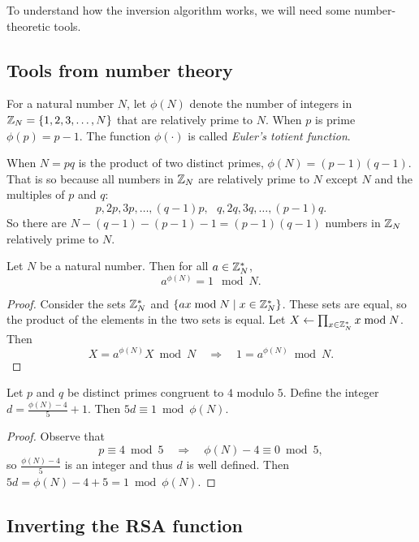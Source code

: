 To understand how the inversion algorithm works, we will need some
number-theoretic tools.


\subsection{Tools from number theory}
For a natural number $N$, let $\phi(N)$ denote the number of integers
in $\mathbb{Z}_N = \{1, 2, 3, \dots, N\}$ that are relatively prime to $N$.
When $p$ is prime $\phi(p) = p-1$.
The function $\phi(\cdot)$ is called \emph{Euler's totient function}.

When $N=pq$ is the product of two distinct primes, $\phi(N) = (p-1)(q-1)$.
That is so because all numbers in $\mathbb{Z}_N$ are relatively prime to $N$ except
$N$ and the multiples of $p$ and $q$:
\[ p, 2p, 3p, \dots, (q-1)p,\ \ \ q, 2q, 3q, \dots, (p-1)q.\]
So there are $N - (q-1) - (p-1) - 1 = (p-1)(q-1)$ numbers
in $\mathbb{Z}_N$ relatively prime to $N$.

\begin{theorem}\label{thm:euler}
Let $N$ be a natural number. Then for all $a \in \mathbb{Z}^*_N$,
\[ a^{\phi(N)} = 1 \mod N.\]
\end{theorem}
\begin{proof}
Consider the sets $\mathbb{Z}^*_N$ and $\{ax \bmod N \mid x \in \mathbb{Z}^*_N\}$.
These sets are equal, so the product of the elements in the two
sets is equal.
Let $X \gets \prod_{x \in \mathbb{Z}^*_N} x \bmod N$.
Then 
\[ X = a^{\phi(N)}X \bmod N \quad \Rightarrow\quad 1 = a^{\phi(N)} \bmod N.\]
\end{proof}



\begin{lemma}\label{lemma:inv}
Let $p$ and $q$ be distinct primes congruent to $4$ modulo $5$.
Define the integer $d = \frac{\phi(N) - 4}{5} + 1$.
Then $5d \equiv 1 \bmod \phi(N)$.
\end{lemma}

\begin{proof}
Observe that
\[ p \equiv 4 \bmod 5 \quad \Rightarrow \quad \phi(N) - 4 \equiv 0 \bmod 5,\]
so $\frac{\phi(N) - 4}{5}$ is an integer and thus $d$ is well defined.
Then $5 d = \phi(N) - 4 + 5 = 1 \bmod \phi(N)$.
\end{proof}


\subsection{Inverting the RSA function}

